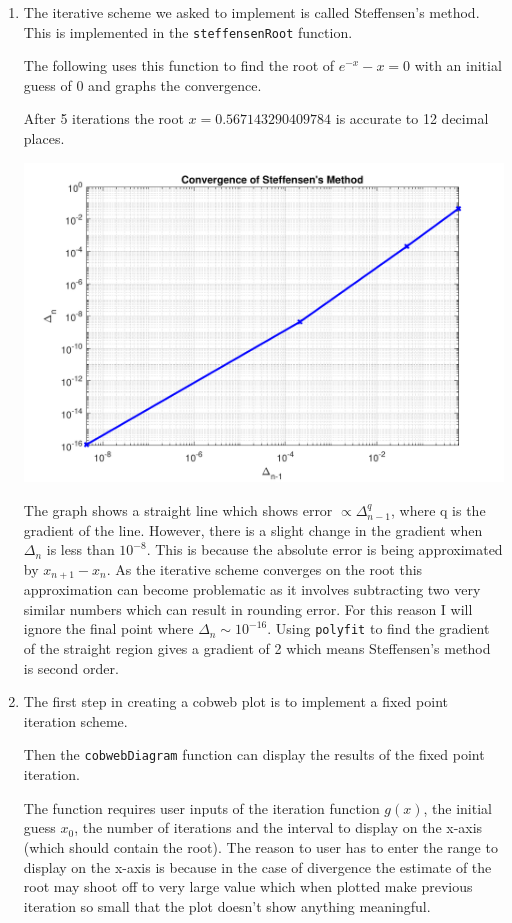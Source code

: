 \documentclass[a4paper,11pt]{article}
\begin{document}
\begin{enumerate}
	\item The iterative scheme we asked to implement is called Steffensen's 
	method\cite{wiki:Steffensen's_method}. This is implemented in the 
	\verb*|steffensenRoot| function.
	
	The following uses this function to find the root of $e^{-x} - x = 0$ 
	with an initial guess of 0 and 
	graphs the convergence.
	
	After 5 iterations the root $x = 0.567143290409784$ is accurate to 12 
	decimal places.
	\begin{center}
		\includegraphics[scale=0.6]{images/Q1c.pdf}
	\end{center}
	The graph shows a straight line which shows error $\propto 
	\Delta_{n-1}^{q}$, 
	where q is the gradient of the line. However, there is a slight change in 
	the gradient when $\Delta_{n}$ is less than $10^{-8}$. This is because 
	the absolute error is being approximated by $x_{n+1}-x_{n}$. As the 
	iterative scheme converges on the root this approximation can become 
	problematic as it involves subtracting two very similar numbers which can 
	result in rounding error. For this reason I will ignore the final point 
	where $\Delta_{n}\sim10^{-16}$. Using \verb*|polyfit| to find the 
	gradient of the straight region gives a gradient of 2 which means 
	Steffensen's method is second order.
	
	
	\item The first step in creating a cobweb plot is to implement a fixed 
	point iteration scheme.
	
	Then the \verb*|cobwebDiagram| function can display the results of the 
	fixed point iteration.
	
	The function requires user inputs of the iteration function $g(x)$, 
	the initial guess $x_{0}$, the number of iterations and the interval to 
	display on the x-axis (which should contain the root). The reason to user 
	has to enter the range to display on the x-axis is because in the case of 
	divergence the estimate of the root may shoot off to very large value 
	which when plotted make previous iteration so small that the plot doesn't 
	show anything meaningful.
	

\end{enumerate}
\end{document}
